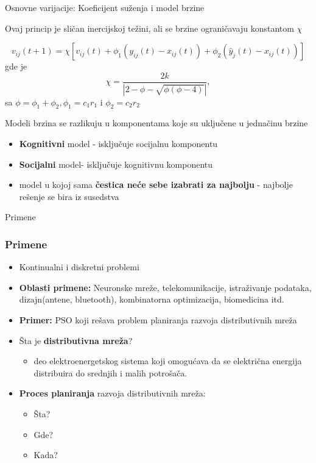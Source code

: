 \documentclass{beamer}
\begin{document}
\begin{frame}{Osnovne varijacije: Koeficijent suženja i model brzine}

Ovaj princip je sličan inercijskoj težini, ali se brzine ograničavaju konstantom $\chi$

\[v_{ij} (t + 1) = \chi[v_{ij} (t) + \phi_1 (y_{ij} (t) - x_{ij} (t)) + \phi_2 (\hat{y}_j (t) - x_{ij} (t))]\]
gde je $$\chi = \frac{2k}{|2-\phi-\sqrt{\phi(\phi-4)}|},$$sa $\phi = \phi_1 +  \phi_2 , \phi_1 = c_1r_1$ i $\phi_2 = c_2r_2$\

Modeli brzina se razlikuju u komponentama koje su uključene u jednačinu brzine
\begin{itemize}
    \item \textbf{Kognitivni} model - isključuje socijalnu komponentu
    \item \textbf{Socijalni} model- isključuje kognitivnu komponentu
    \item model u kojoj sama \textbf{čestica neće sebe izabrati za najbolju} - najbolje rešenje se bira iz susedstva
    
\end{itemize}

\end{frame}

\begin{frame}{Primene}

\frametitle{Primene}
\begin{itemize}
\item Kontinualni i diskretni problemi
\item \textbf{Oblasti primene:} Neuronske mreže, telekomunikacije, istraživanje podataka, dizajn(antene, bluetooth), kombinatorna optimizacija, biomedicina itd.
\item \textbf{Primer:} PSO koji rešava problem planiranja razvoja distributivnih mreža
\item Šta je \textbf{distributivna mreža}?
\begin{itemize}
    \item deo elektroenergetskog sistema koji omogućava da se električna energija distribuira do srednjih i malih potrošača. 
\end{itemize}
\item \textbf{Proces planiranja} razvoja distributivnih mreža:
\begin{itemize}
    \item Šta?
    \item Gde? 
    \item Kada?
\end{itemize}

\end{itemize}


\end{frame}
\end{document}
